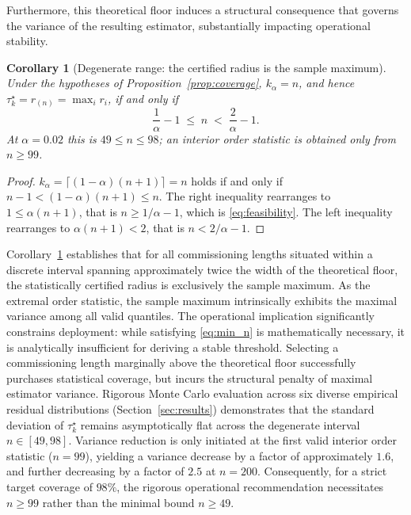 \documentclass[a4paper]{cas-sc}
\newtheorem{corollary}{Corollary}
\newcommand{\residual}{\ensuremath{r}}
\begin{document}
Furthermore, this theoretical floor induces a structural consequence that governs the variance of the resulting estimator, substantially impacting operational stability.

\begin{corollary}[Degenerate range: the certified radius is the sample maximum]
\label{cor:degenerate_range}
Under the hypotheses of Proposition~\ref{prop:coverage},
\(k_\alpha = n\), and hence
\(\tau_k^\star = \residual_{(n)} = \max_i \residual_i\), if and only if
\begin{equation}
\frac{1}{\alpha}-1 \;\le\; n \;<\; \frac{2}{\alpha}-1 .
\label{eq:degenerate_range}
\end{equation}
At \(\alpha=0.02\) this is \(49\le n\le 98\); an interior order statistic is
obtained only from \(n\ge 99\).
\end{corollary}

\begin{proof}
\(k_\alpha=\lceil(1-\alpha)(n+1)\rceil=n\) holds if and only if
\(n-1<(1-\alpha)(n+1)\le n\). The right inequality rearranges to
\(1\le\alpha(n+1)\), that is \(n\ge 1/\alpha-1\), which is
\eqref{eq:feasibility}. The left inequality rearranges to
\(\alpha(n+1)<2\), that is \(n<2/\alpha-1\).
\end{proof}

Corollary~\ref{cor:degenerate_range} establishes that for all commissioning lengths situated within a discrete interval spanning approximately twice the width of the theoretical floor, the statistically certified radius is exclusively the sample maximum. As the extremal order statistic, the sample maximum intrinsically exhibits the maximal variance among all valid quantiles. The operational implication significantly constrains deployment: while satisfying \eqref{eq:min_n} is mathematically necessary, it is analytically insufficient for deriving a stable threshold. Selecting a commissioning length marginally above the theoretical floor successfully purchases statistical coverage, but incurs the structural penalty of maximal estimator variance. Rigorous Monte Carlo evaluation across six diverse empirical residual distributions (Section~\ref{sec:results}) demonstrates that the standard deviation of \(\tau_k^\star\) remains asymptotically flat across the degenerate interval \(n\in[49,98]\). Variance reduction is only initiated at the first valid interior order statistic (\(n=99\)), yielding a variance decrease by a factor of approximately \(1.6\), and further decreasing by a factor of \(2.5\) at \(n=200\). Consequently, for a strict target coverage of \(98\%\), the rigorous operational recommendation necessitates \(n\ge 99\) rather than the minimal bound \(n\ge 49\).
\end{document}

